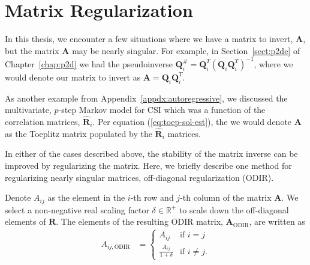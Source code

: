 \chapter{Matrix Regularization}
\label{appdx:odir}

In this thesis, we encounter a few situations where we have a matrix to invert, $\mathbf{A}$, but the matrix $\mathbf{A}$ may be nearly singular. For example, in Section~\ref{sect:p2de} of Chapter~\ref{chap:p2d} we had the pseudoinverse $\mathbf{Q}_i^{\#} = \mathbf{Q}_i^T\left(\mathbf{Q}_i\mathbf{Q}_i^T\right)^{-1}$, where we would denote our matrix to invert as $\mathbf{A}=\mathbf{Q}_i\mathbf{Q}_i^T$.

As another example from Appendix~\ref{appdx:autoregressive}, we discussed the multivariate, $p$-step Markov model for CSI which was a function of the correlation matrices, $\hat{\mathbf{R}}_i$. Per equation (\ref{eq:toep-sol-est}), the we would denote $\mathbf{A}$ as the Toeplitz matrix populated by the $\hat{\mathbf{R}}_i$ matrices.

In either of the cases described above, the stability of the matrix inverse can be improved by regularizing the matrix. Here, we briefly describe one method for regularizing nearly singular matrices, off-diagonal regularization (ODIR).

Denote $A_{ij}$ as the element in the $i$-th row and $j$-th column of the matrix $\mathbf{A}$. We select a non-negative real scaling factor $\delta \in \mathbb{R}^{+}$ to scale down the off-diagonal elements of $\mathbf{R}$. The elements of the resulting ODIR matrix, $\mathbf{A}_{\text{ODIR}}$, are written as
\begin{align}
    A_{ij, \text{ODIR}} &= 
        \begin{cases}
            A_{ij} & \text{if } i = j\\
            \frac{A_{ij}}{1+\delta} & \text{if } i \neq j.
        \end{cases}
\end{align}